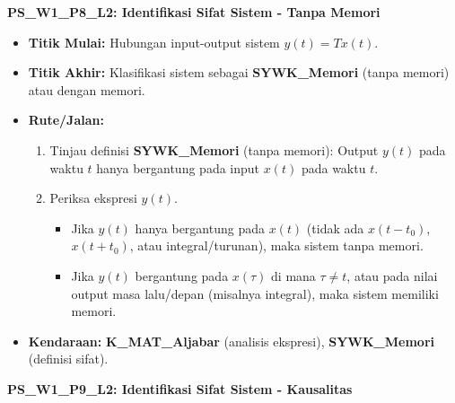\documentclass[
  letterpaper,
  DIV=11,
  numbers=noendperiod]{scrreprt}
\providecommand{\tightlist}{%
  \setlength{\itemsep}{0pt}\setlength{\parskip}{0pt}}
\begin{document}
\textbf{PS\_W1\_P8\_L2: Identifikasi Sifat Sistem - Tanpa Memori}

\begin{itemize}
\tightlist
\item
  \textbf{Titik Mulai:} Hubungan input-output sistem \(y(t) = T{x(t)}\).
\item
  \textbf{Titik Akhir:} Klasifikasi sistem sebagai \textbf{SYWK\_Memori}
  (tanpa memori) atau dengan memori.
\item
  \textbf{Rute/Jalan:}

  \begin{enumerate}
  \def\labelenumi{\arabic{enumi}.}
  \tightlist
  \item
    Tinjau definisi \textbf{SYWK\_Memori} (tanpa memori): Output
    \(y(t)\) pada waktu \(t\) hanya bergantung pada input \(x(t)\) pada
    waktu \(t\).
  \item
    Periksa ekspresi \(y(t)\).

    \begin{itemize}
    \tightlist
    \item
      Jika \(y(t)\) hanya bergantung pada \(x(t)\) (tidak ada
      \(x(t-t_0)\), \(x(t+t_0)\), atau integral/turunan), maka sistem
      tanpa memori.
    \item
      Jika \(y(t)\) bergantung pada \(x(\tau)\) di mana \(\tau \neq t\),
      atau pada nilai output masa lalu/depan (misalnya integral), maka
      sistem memiliki memori.
    \end{itemize}
  \end{enumerate}
\item
  \textbf{Kendaraan:} \textbf{K\_MAT\_Aljabar} (analisis ekspresi),
  \textbf{SYWK\_Memori} (definisi sifat).
\end{itemize}

\textbf{PS\_W1\_P9\_L2: Identifikasi Sifat Sistem - Kausalitas}
\end{document}
